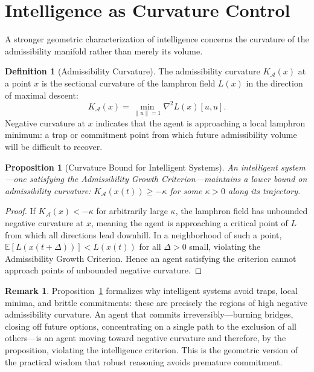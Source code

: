 \documentclass[12pt, oneside]{book}
\theoremstyle{flyxion}
\newtheorem{proposition}[theorem]{Proposition}
\theoremstyle{definition}
\newtheorem{definition}[theorem]{Definition}
\newtheorem{remark}[theorem]{Remark}
\begin{document}
\section{Intelligence as Curvature Control}

A stronger geometric characterization of intelligence
concerns the curvature of the admissibility manifold
rather than merely its volume.

\begin{definition}[Admissibility Curvature]
The admissibility curvature $K_\mathcal{A}(x)$ at a
point $x$ is the sectional curvature of the lamphron
field $L(x)$ in the direction of maximal descent:
\[
K_\mathcal{A}(x) = \min_{\|u\|=1} \nabla^2 L(x)[u,u].
\]
Negative curvature at $x$ indicates that the agent
is approaching a local lamphron minimum: a trap or
commitment point from which future admissibility
volume will be difficult to recover.
\end{definition}

\begin{proposition}[Curvature Bound for Intelligent Systems]
\label{prop:curvature_bound}
An intelligent system---one satisfying the Admissibility
Growth Criterion---maintains a lower bound on admissibility
curvature: $K_\mathcal{A}(x(t)) \geq -\kappa$ for
some $\kappa > 0$ along its trajectory.
\end{proposition}

\begin{proof}
If $K_\mathcal{A}(x) < -\kappa$ for arbitrarily large
$\kappa$, the lamphron field has unbounded negative
curvature at $x$, meaning the agent is approaching a
critical point of $L$ from which all directions lead
downhill. In a neighborhood of such a point,
$\mathbb{E}[L(x(t+\Delta))] < L(x(t))$ for all
$\Delta > 0$ small, violating the Admissibility Growth
Criterion. Hence an agent satisfying the criterion
cannot approach points of unbounded negative curvature.
\end{proof}

\begin{remark}
Proposition~\ref{prop:curvature_bound} formalizes why
intelligent systems avoid traps, local minima, and
brittle commitments: these are precisely the regions
of high negative admissibility curvature. An agent
that commits irreversibly---burning bridges, closing
off future options, concentrating on a single path
to the exclusion of all others---is an agent moving
toward negative curvature and therefore, by the
proposition, violating the intelligence criterion.
This is the geometric version of the practical wisdom
that robust reasoning avoids premature commitment.
\end{remark}
\end{document}
